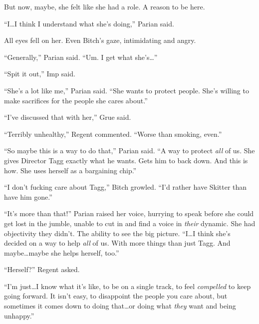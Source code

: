 But now, maybe, she felt like she had a role.  A reason to be here.



``I\ldots I think I understand what she's doing,'' Parian said.



All eyes fell on her.  Even Bitch's gaze, intimidating and angry.



``Generally,'' Parian said.  ``Um.  I get what she's\ldots''



``Spit it out,'' Imp said.



``She's a lot like me,'' Parian said.  ``She wants to protect people.  She's willing to make sacrifices for the people she cares about.''



``I've discussed that with her,'' Grue said.



``Terribly unhealthy,'' Regent commented.  ``Worse than smoking, even.''



``So maybe this is a way to do that,'' Parian said.  ``A way to protect \emph{all} of us.  She gives Director Tagg exactly what he wants.  Gets him to back down.  And this is how.  She uses herself as a bargaining chip.''



``I don't fucking care about Tagg,'' Bitch growled.  ``I'd rather have Skitter than have him gone.''



``It's more than that!'' Parian raised her voice, hurrying to speak before she could get lost in the jumble, unable to cut in and find a voice in \emph{their} dynamic.  She had objectivity they didn't.  The ability to see the big picture.  ``I\ldots I think she's decided on a way to help \emph{all} of us.  With more things than just Tagg.  And maybe\ldots maybe she helps herself, too.''



``Herself?'' Regent asked.



``I'm just\ldots I know what it's like, to be on a single track, to feel \emph{compelled} to keep going forward.  It isn't easy, to disappoint the people you care about, but sometimes it comes down to doing that\ldots or doing what \emph{they} want and being unhappy.''



